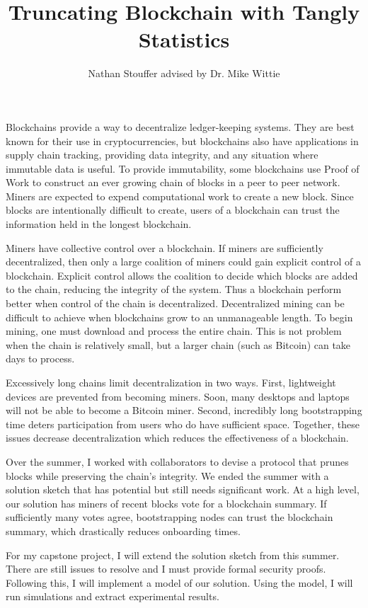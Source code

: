 \documentclass[11pt]{article}
\title{Truncating Blockchain with Tangly Statistics}
\author{Nathan Stouffer advised by Dr. Mike Wittie}
\date{}
\begin{document}
    \maketitle

    Blockchains provide a way to decentralize ledger-keeping systems.
    They are best known for their use in cryptocurrencies, but blockchains also have applications in supply chain tracking, providing data integrity, and any situation where immutable data is useful.
    To provide immutability, some blockchains use Proof of Work to construct an ever growing chain of blocks in a peer to peer network.
    Miners are expected to expend computational work to create a new block.
    Since blocks are intentionally difficult to create, users of a blockchain can trust the information held in the longest blockchain.

    Miners have collective control over a blockchain.
    If miners are sufficiently decentralized, then only a large coalition of miners could  gain explicit control of a blockchain.
    Explicit control allows the coalition to decide which blocks are added to the chain, reducing the integrity of the system.
    Thus a blockchain perform better when control of the chain is decentralized.
    Decentralized mining can be difficult to achieve when blockchains grow to an unmanageable length.
    To begin mining, one must download and process the entire chain.
    This is not problem when the chain is relatively small, but a larger chain (such as Bitcoin) can take days to process.

    Excessively long chains limit decentralization in two ways.
    First, lightweight devices are prevented from becoming miners.
    Soon, many desktops and laptops will not be able to become a Bitcoin miner.
    Second, incredibly long bootstrapping time deters participation from users who do have sufficient space.
    Together, these issues decrease decentralization which reduces the effectiveness of a blockchain.

    Over the summer, I worked with collaborators to devise a protocol that prunes blocks while preserving the chain's integrity.
    We ended the summer with a solution sketch that has potential but still needs significant work.
    At a high level, our solution has miners of recent blocks vote for a blockchain summary.
    If sufficiently many votes agree, bootstrapping nodes can trust the blockchain summary, which drastically reduces onboarding times.

    For my capstone project, I will extend the solution sketch from this summer.
    There are still issues to resolve and I must provide formal security proofs.
    Following this, I will implement a model of our solution.
    Using the model, I will run simulations and extract experimental results.
\end{document}
